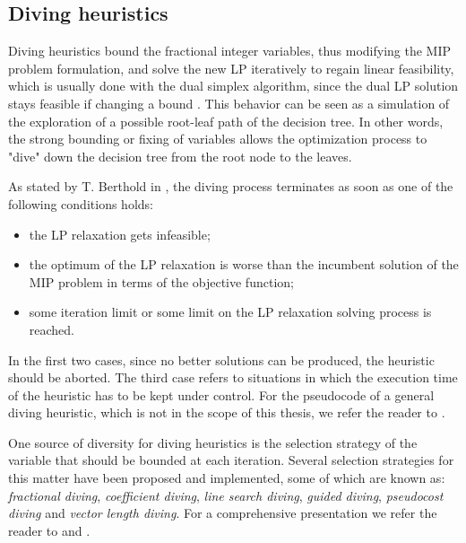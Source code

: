 \documentclass[a4paper,12pt,twoside]{scrbook}
\begin{document}
\subsection{Diving heuristics} \label{sec:divingheur}
Diving heuristics bound the fractional integer variables, thus modifying the MIP problem formulation, and solve the new LP iteratively to regain linear feasibility, which is usually done with the dual simplex algorithm, since the dual LP solution stays feasible if changing a bound \cite{berthold2006}. This behavior can be seen as a simulation of the exploration of a possible root-leaf path of the decision tree. In other words, the strong bounding or fixing of variables allows the optimization process to "dive" down the decision tree from the root node to the leaves. \par 
As stated by T. Berthold in \cite{berthold2006}, the diving process terminates as soon as one of the following conditions holds:
\begin{itemize}
	\item the LP relaxation gets infeasible;
	\item the optimum of the LP relaxation is worse than the incumbent solution of the MIP problem in terms of the objective function;
	\item some iteration limit or some limit on the LP relaxation solving process is reached.
\end{itemize}
In the first two cases, since no better solutions can be produced, the heuristic should be aborted. The third case refers to situations in which the execution time of the heuristic has to be kept under control. For the pseudocode of a general diving heuristic, which is not in the scope of this thesis, we refer the reader to \cite{berthold2006}. \par 
One source of diversity for diving heuristics is the selection strategy of the variable that should be bounded at each iteration. Several selection strategies for this matter have been proposed and implemented, some of which are known as: \textit{fractional diving}, \textit{coefficient diving}, \textit{line search diving}, \textit{guided diving}, \textit{pseudocost diving} and \textit{vector length diving}. For a comprehensive presentation we refer the reader to \cite{berthold2006} and \cite{hendel2011}. \par 
\end{document}
